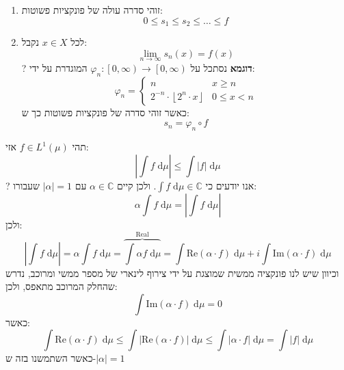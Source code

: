 \documentclass{tstextbook}
\begin{document}
\begin{enumerate}
  \item זוהי סדרה עולה של פונקציות פשוטות: 
$$0\leq s_{1} \leq s_{2} \leq \dots \leq f$$


  \item לכל \(x \in X\) נקבל: 
$$\lim_{ n \to \infty } s_{n}(x)=f(x)$$
?
\textbf{דוגמא}
נסתכל על \(\varphi_{n}:\left[ 0,\infty \right)\to\left[ 0,\infty \right)\) המוגדרת על ידי:
$$\varphi_{n}=\begin{cases}n  & x\geq n \\2^{-n}\cdot \left\lfloor  2^{n}\cdot x  \right\rfloor  & 0\leq x < n
\end{cases}$$
כאשר זוהי סדרה של פונקציות פשוטות כך ש:
$$s_{n}=\varphi_{n}\circ  f$$


\end{enumerate}
\begin{proposition}
תהי \(f \in L^{1}\left( \mu \right)\) אזי:
$$\left\lvert  \int f \;\mathrm{d} \mu   \right\rvert \leq \int \lvert f \rvert  \;\mathrm{d} \mu $$
?
אנו יודעים כי \(\int f \;\mathrm{d} \mu \in \mathbb{C}\). ולכן קיים \(\alpha \in \mathbb{C}\) עם \(\left\lvert  \alpha  \right\rvert=1\) שעבורו:
$$\alpha \int f \;\mathrm{d} \mu = \left\lvert  \int f \;\mathrm{d} \mu   \right\rvert  $$
ולכן:
$$\left\lvert  \int f \;\mathrm{d} \mu   \right\rvert =\alpha \int f \;\mathrm{d} \mu = \overbrace{ \int \alpha f\;\mathrm{d} \mu }^{ \text{Real} }  =\int \mathrm{Re}\left( \alpha \cdot f \right) \;\mathrm{d} \mu + i \int \mathrm{Im}\left( \alpha \cdot f \right) \;\mathrm{d} \mu  $$
וכיוון שיש לנו פונקציה ממשית שמוצגת על ידי צירוף לינארי של מספר ממשי ומרוכב, נדרש שהחלק המרוכב מתאפס, ולכן:
$$\int \mathrm{Im}\left( \alpha \cdot f \right) \;\mathrm{d} \mu=0 $$
כאשר:
$$\int \mathrm{Re}\left( \alpha \cdot f \right) \;\mathrm{d} \mu \leq \int \left\lvert  \mathrm{Re}\left( \alpha \cdot f \right)  \right\rvert  \;\mathrm{d} \mu \leq \int  \left\lvert  \alpha \cdot f  \right\rvert  \;\mathrm{d} \mu = \int \lvert f \rvert  \;\mathrm{d} \mu   $$
כאשר השתמשנו בזה ש-\(\left\lvert  \alpha  \right\rvert=1\)

\end{proposition}
\end{document}
